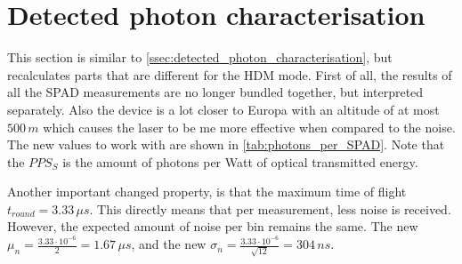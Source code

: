 \section{Detected photon characterisation}\label{ssec:HDM_detected_photon_characterisation}
This section is similar to \cref{ssec:detected_photon_characterisation}, but recalculates parts that are different for the HDM mode. First of all, the results of all the SPAD measurements are no longer bundled together, but interpreted separately. Also the device is a lot closer to Europa with an altitude of at most $500\,m$ which causes the laser to be me more effective when compared to the noise. The new values to work with are shown in \cref{tab:photons_per_SPAD}. Note that the $PPS_S$ is the amount of photons per Watt of optical transmitted energy.




Another important changed property, is that the maximum time of flight $t_{round}=3.33\,\mu s$. This directly means that per measurement, less noise is received. However, the expected amount of noise per bin remains the same. The new $\mu_n=\frac{3.33\cdot10^{-6}}{2}=1.67\,\mu s$, and the new $\sigma_n=\frac{3.33\cdot10^{-6}}{\sqrt{12}}=304\,ns$. 
